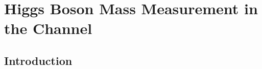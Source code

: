\chapter{Higgs Boson Mass Measurement in the \hzzfourl Channel}\label{ch:higgs_mass}

\section{Introduction}\label{sec:higgs_intro}